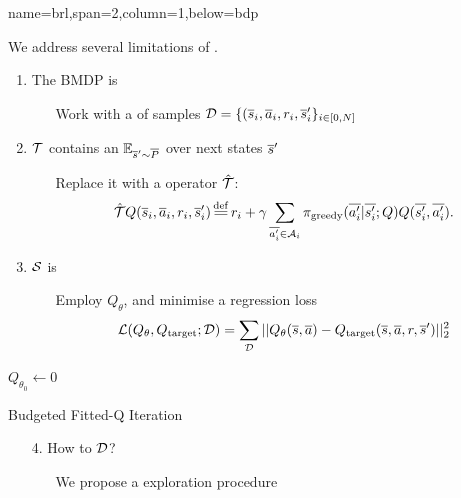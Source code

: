 \documentclass[paperwidth=36in,paperheight=48in,portrait,fontscale=0.355, margin=2cm]{baposter}
\begin{document}
\begin{poster}
{name=brl,span=2,column=1,below=bdp}{ 

We address several limitations of .\\

\begin{minipage}{0.65\textwidth}
\begin{enumerate}
    \item The BMDP is 
\begin{itemize}[nolistsep]
    \item[\incarrow] Work with a  of samples $\mathcal{D}=\{(\overline{s}_i,\overline{a}_i,r_i,\overline{s}_i'\}_{i\in [0,N]}$
\end{itemize}
\item $\mathcal{T}$ contains an  $\operatorname*{\mathbb{E}}_{\overline{s}'\sim \overline{P}}$ over next states $\overline{s}'$
\begin{itemize}[nolistsep]
    \item[\incarrow] Replace it with a  operator $\hat{\mathcal{T}}$:
\begin{equation*}
    \hat{\cT} Q(\os_i, \oa_i, r_i, \os'_i) \eqdef r_i + \gamma \sum_{\ov{a'_i}\in \cA_i} \pi_\text{greedy}(\ov{a'_i}|\ov{s'_i}; Q) Q(\ov{s'_i}, \ov{a'_i}).
\end{equation*}
\end{itemize}
\item $\mathcal{S}$ is 
\begin{itemize}[nolistsep]
    \item[\incarrow] Employ  $Q_\theta$, and minimise a regression loss 
    $$\mathcal{L}(Q_\theta, Q_\text{target};\mathcal{D}) = \sum_{\mathcal{D}} ||Q_\theta(\overline{s}, \overline{a}) - Q_\text{target}(\overline{s}, \overline{a}, r, \overline{s}')||_2^2$$
\end{itemize}
\end{enumerate}

\end{minipage}
\begin{minipage}{0.34\textwidth}
\begin{algorithm}[H]
\DontPrintSemicolon
\KwData{$\cD$}
$Q_{\theta_0} \leftarrow 0$\;
\caption{Budgeted Fitted-Q Iteration}
\label{algo:bftq}
\end{algorithm}
\vspace{1em}
\begin{enumerate}[nolistsep]
    \item[4.] How to  $\cD$?
    \begin{itemize}[nolistsep]
        \item[\incarrow] We propose a  exploration procedure
    \end{itemize}
\end{enumerate}
\end{minipage}
}


\end{poster}
\end{document}
